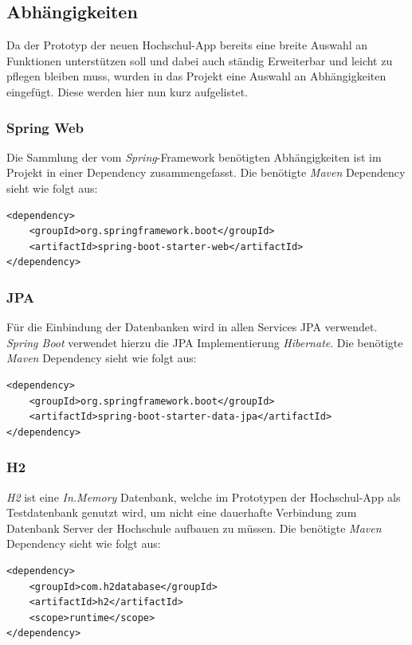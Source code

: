 \subsection*{Abhängigkeiten}
\label{sec:dependencies}

Da der Prototyp der neuen Hochschul-\ac{App} bereits eine breite Auswahl an Funktionen unterstützen soll und dabei auch ständig Erweiterbar und leicht zu pflegen bleiben muss, wurden in das Projekt eine Auswahl an Abhängigkeiten eingefügt. Diese werden hier nun kurz aufgelistet.

\subsubsection*{Spring Web}
Die Sammlung der vom \textit{Spring}-Framework benötigten Abhängigkeiten ist im Projekt in einer Dependency zusammengefasst. Die benötigte \textit{Maven} Dependency sieht wie folgt aus:
\begin{lstlisting}[caption={\textit{Spring Web} Dependency}]
<dependency>
    <groupId>org.springframework.boot</groupId>
    <artifactId>spring-boot-starter-web</artifactId>
</dependency>
\end{lstlisting}

\subsubsection*{JPA}
Für die Einbindung der Datenbanken wird in allen Services \ac{JPA} verwendet. \textit{Spring Boot} verwendet hierzu die \ac{JPA} Implementierung \textit{Hibernate}. Die benötigte \textit{Maven} Dependency sieht wie folgt aus:
\begin{lstlisting}[caption={Spring Data JPA Dependency}]
<dependency>
    <groupId>org.springframework.boot</groupId>
    <artifactId>spring-boot-starter-data-jpa</artifactId>
</dependency>
\end{lstlisting}

\subsubsection*{H2} 
\textit{H2} ist eine \textit{In.Memory} Datenbank, welche im Prototypen der Hochschul-\ac{App} als Testdatenbank genutzt wird, um nicht eine dauerhafte Verbindung zum Datenbank Server der Hochschule aufbauen zu müssen. Die benötigte \textit{Maven} Dependency sieht wie folgt aus:
\begin{lstlisting}[caption={H2 Dependency}]
<dependency>
    <groupId>com.h2database</groupId>
    <artifactId>h2</artifactId>
    <scope>runtime</scope>
</dependency>
\end{lstlisting}

